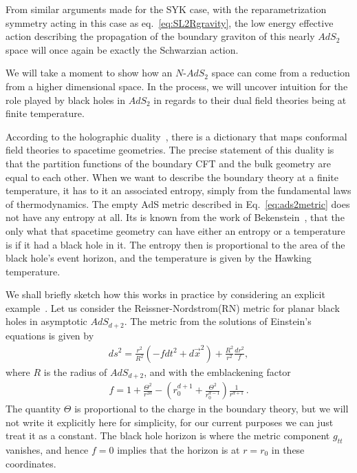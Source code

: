 \par
From similar arguments made for the SYK case, with the reparametrization symmetry acting in this case as eq.~\eqref{eq:SL2Rgravity}, the low energy effective action describing the propagation of the boundary graviton of this nearly $AdS_2$ space will once again be exactly the Schwarzian action. 
\par
We will take a moment to show how an $N$-$AdS_2$ space can come from a reduction from a higher dimensional space. In the process, we will uncover intuition for the role played by black holes in $AdS_2$ in regards to their dual field theories being at finite temperature.
\par
According to the holographic duality~\cite{maldacena1999large,gubser1998gauge,witten1998anti,zaanen2015holographic}, there is a dictionary that maps conformal field theories to spacetime geometries. The precise statement of this duality is that the partition functions of the boundary CFT and the bulk geometry are equal to each other. When we want to describe the  boundary theory at a finite temperature, it has to it an associated entropy, simply from the fundamental laws of thermodynamics. The empty AdS metric described in Eq.~\eqref{eq:ads2metric} does not have any entropy at all. Its is known from the work of Bekenstein~\cite{bekenstein1973black}, that the only what that spacetime geometry can have either an entropy or a temperature is if it had a black hole in it. The entropy then is proportional to the area of the black hole's event horizon, and the temperature is given by the Hawking temperature. 
\par 
We shall briefly sketch how this works in practice by considering an explicit  example~\cite{sachdev2015bekenstein,faulkner2011emergent,faulkner2011holographic}. Let us consider the Reissner-Nordstrom(RN) metric for planar black holes in asymptotic $AdS_{d+2}$. 
The metric from the solutions of Einstein's equations is given by
\begin{align}
    ds^2 = \frac{r^2}{R^2}\left(-f dt^2 + d\vec{x}^2\right) + \frac{R^2}{r^2}\frac{dr^2}{f}, 
    \label{eq:RNmetric}
\end{align}
where $R$ is the radius of $AdS_{d+2}$, and with the emblackening factor 
\begin{align}
    f = 1+\frac{\Theta^2}{r^{2d}} - \left(r_0^{d+1} + \frac{\Theta^2}{r_0^{d-1}}\right)\frac{1}{r^{d+1}}\,.
    \label{eq:RNemblackening}
\end{align}
The quantity $\Theta$ is proportional to the charge in the boundary theory, but we will not write it explicitly here for simplicity, for our current purposes we can just treat it as a constant. The black hole horizon is where the metric component $g_{tt}$ vanishes, and hence $f = 0$ implies that the horizon is at $r = r_0$ in these coordinates. 
